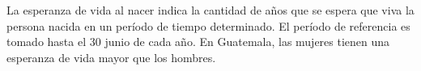 La esperanza de vida al nacer indica la cantidad de años que se espera que viva la persona nacida en un período de tiempo determinado. El período de referencia es tomado hasta el 30 junio de cada año. En Guatemala, las mujeres tienen una esperanza de vida mayor que los hombres.